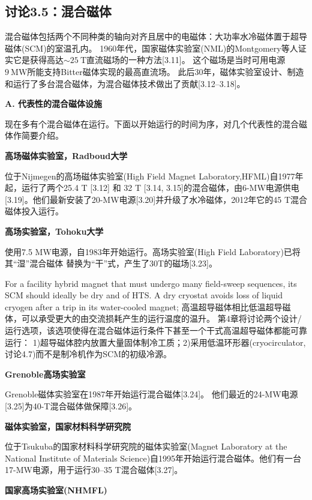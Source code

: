\newpage

\subsection{讨论3.5：混合磁体}
混合磁体包括两个不同种类的轴向对齐且居中的电磁体：大功率水冷磁体置于超导磁体(SCM)的室温孔内。
1960年代，国家磁体实验室(NML)的Montgomery等人证实它是获得高达$\sim 25\ \mathrm{T}$直流磁场的一种方法[3.11]。
这个磁场是当时可用电源$9\ \mathrm{MW}$所能支持Bitter磁体实现的最高直流场。
此后30年，磁体实验室设计、制造和运行了多台混合磁体，为混合磁体技术做出了贡献[3.12–3.18]。

\textbf{A. 代表性的混合磁体设施}

现在多有个混合磁体在运行。下面以开始运行的时间为序，对几个代表性的混合磁体作简要介绍。

\textbf{\kaishu 高场磁体实验室，Radboud大学}

位于Nijmegen的高场磁体实验室(High Field Magnet Laboratory,HFML)自1977年起，运行了两个25.4 T [3.12] 和 32 T [3.14, 3.15]的混合磁体，由6-MW电源供电[3.19]。他们最新安装了20-MW电源[3.20]并升级了水冷磁体，2012年它的45 T混合磁体投入运行。

\textbf{\kaishu 高场实验室，Tohoku大学}

使用7.5 MW电源，自1983年开始运行。高场实验室(High Field Laboratory)已将其“湿”混合磁体
替换为“干”式，产生了30T的磁场[3.23]。

For a facility hybrid magnet that must undergo many field-sweep sequences, its
SCM should ideally be dry and of HTS. A dry cryostat avoids loss of liquid cryogen
after a trip in its water-cooled magnet;
高温超导磁体相比低温超导磁体，可以承受更大的由交流损耗产生的运行温度的温升。
第4章将讨论两个设计/运行选项，该选项使得在混合磁体运行条件下甚至一个干式高温超导磁体都能可靠运行：
1)超导磁体腔内放置大量固体制冷工质；2)采用低温环形器(cryocirculator,讨论4.7)而不是制冷机作为SCM的初级冷源。

\textbf{\kaishu Grenoble高场实验室}

Grenoble磁体实验室在1987年开始运行混合磁体[3.24]。
他们最近的24-MW电源[3.25]为40-T混合磁体做保障[3.26]。

\textbf{\kaishu 磁体实验室，国家材料科学研究院}

位于Tsukuba的国家材料科学研究院的磁体实验室(Magnet Laboratory at the National Institute of Materials Science)自1995年开始运行混合磁体。他们有一台17-MW电源，用于运行30–35 T混合磁体[3.27]。

\textbf{\kaishu 国家高场实验室(NHMFL)}


